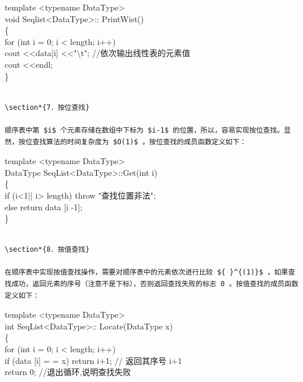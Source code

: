 \documentclass[10pt]{article}
\begin{document}
template <typename DataType>\\
void Seqlist<DataType>:: PrintWist()\\
\{\\
for (int i = 0; i < length; i++)\\[0pt]
cout <<data[i] <<"\textbackslash t"; //依次输出线性表的元素值\\
cout <<endl;\\
\}

\begin{verbatim}

\section*{7．按位查找}

顺序表中第 $i$ 个元素存储在数组中下标为 $i-1$ 的位置，所以，容易实现按位查找。显然，按位查找算法的时间复杂度为 $O(1)$ 。按位查找的成员函数定义如下：
\end{verbatim}

template <typename DataType>\\
DataType SeqList<DataType>::Get(int i)\\
\{\\
if (i<1|| i> length) throw "查找位置非法";\\[0pt]
else return data [i -1];\\
\}

\begin{verbatim}

\section*{8．按值查找}

在顺序表中实现按值查找操作，需要对顺序表中的元素依次进行比较 ${ }^{(1)}$ ，如果查找成功，返回元素的序号（注意不是下标），否则返回查找失败的标志 0 。按值查找的成员函数定义如下：
\end{verbatim}

template <typename DataType>\\
int SeqList<DataType>:: Locate(DataType x)\\
\{\\
for (int i = 0; i < length; i++)\\[0pt]
if (data [i] = = x) return i+1; // 返回其序号 i+1\\
return 0; //退出循环,说明查找失败
\end{document}
